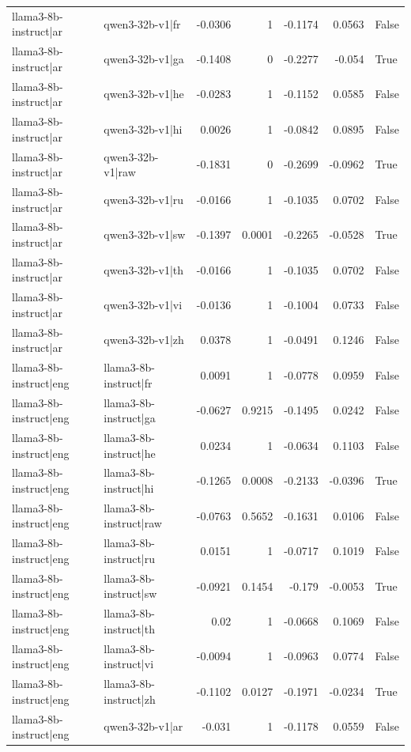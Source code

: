 \begin{table}
\begin{tabular}{l l r r r r l}
llama3-8b-instruct|ar & qwen3-32b-v1|fr & -0.0306 & 1 & -0.1174 & 0.0563 & False \\
llama3-8b-instruct|ar & qwen3-32b-v1|ga & -0.1408 & 0 & -0.2277 & -0.054 & True \\
llama3-8b-instruct|ar & qwen3-32b-v1|he & -0.0283 & 1 & -0.1152 & 0.0585 & False \\
llama3-8b-instruct|ar & qwen3-32b-v1|hi & 0.0026 & 1 & -0.0842 & 0.0895 & False \\
llama3-8b-instruct|ar & qwen3-32b-v1|raw & -0.1831 & 0 & -0.2699 & -0.0962 & True \\
llama3-8b-instruct|ar & qwen3-32b-v1|ru & -0.0166 & 1 & -0.1035 & 0.0702 & False \\
llama3-8b-instruct|ar & qwen3-32b-v1|sw & -0.1397 & 0.0001 & -0.2265 & -0.0528 & True \\
llama3-8b-instruct|ar & qwen3-32b-v1|th & -0.0166 & 1 & -0.1035 & 0.0702 & False \\
llama3-8b-instruct|ar & qwen3-32b-v1|vi & -0.0136 & 1 & -0.1004 & 0.0733 & False \\
llama3-8b-instruct|ar & qwen3-32b-v1|zh & 0.0378 & 1 & -0.0491 & 0.1246 & False \\
llama3-8b-instruct|eng & llama3-8b-instruct|fr & 0.0091 & 1 & -0.0778 & 0.0959 & False \\
llama3-8b-instruct|eng & llama3-8b-instruct|ga & -0.0627 & 0.9215 & -0.1495 & 0.0242 & False \\
llama3-8b-instruct|eng & llama3-8b-instruct|he & 0.0234 & 1 & -0.0634 & 0.1103 & False \\
llama3-8b-instruct|eng & llama3-8b-instruct|hi & -0.1265 & 0.0008 & -0.2133 & -0.0396 & True \\
llama3-8b-instruct|eng & llama3-8b-instruct|raw & -0.0763 & 0.5652 & -0.1631 & 0.0106 & False \\
llama3-8b-instruct|eng & llama3-8b-instruct|ru & 0.0151 & 1 & -0.0717 & 0.1019 & False \\
llama3-8b-instruct|eng & llama3-8b-instruct|sw & -0.0921 & 0.1454 & -0.179 & -0.0053 & True \\
llama3-8b-instruct|eng & llama3-8b-instruct|th & 0.02 & 1 & -0.0668 & 0.1069 & False \\
llama3-8b-instruct|eng & llama3-8b-instruct|vi & -0.0094 & 1 & -0.0963 & 0.0774 & False \\
llama3-8b-instruct|eng & llama3-8b-instruct|zh & -0.1102 & 0.0127 & -0.1971 & -0.0234 & True \\
llama3-8b-instruct|eng & qwen3-32b-v1|ar & -0.031 & 1 & -0.1178 & 0.0559 & False \\

\end{tabular}
\end{table}
